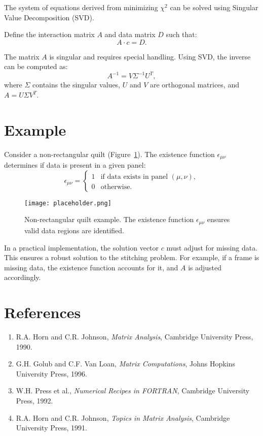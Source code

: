 \documentclass[12pt]{article}
\begin{document}
The system of equations derived from minimizing $\chi^2$ can be solved using Singular Value Decomposition (SVD). 

Define the interaction matrix $A$ and data matrix $D$ such that:
\[
A \cdot c = D.
\]

The matrix $A$ is singular and requires special handling. Using SVD, the inverse can be computed as:
\[
A^{-1} = V \Sigma^{-1} U^T,
\]
where $\Sigma$ contains the singular values, $U$ and $V$ are orthogonal matrices, and $A = U \Sigma V^T$.

\section{Example}

Consider a non-rectangular quilt (Figure~\ref{fig:nonrectangular}). The existence function $\epsilon_{\mu\nu}$ determines if data is present in a given panel:
\[
\epsilon_{\mu\nu} =
\begin{cases}
1 & \text{if data exists in panel } (\mu, \nu), \\
0 & \text{otherwise.}
\end{cases}
\]

\begin{figure}[h!]
    \centering
    \texttt{[image: placeholder.png]}
    \caption{Non-rectangular quilt example. The existence function $\epsilon_{\mu\nu}$ ensures valid data regions are identified.}
    \label{fig:nonrectangular}
\end{figure}

In a practical implementation, the solution vector $c$ must adjust for missing data. This ensures a robust solution to the stitching problem. For example, if a frame is missing data, the existence function accounts for it, and $A$ is adjusted accordingly.

\section{References}

\begin{enumerate}
    \item R.A. Horn and C.R. Johnson, \textit{Matrix Analysis}, Cambridge University Press, 1990.
    \item G.H. Golub and C.F. Van Loan, \textit{Matrix Computations}, Johns Hopkins University Press, 1996.
    \item W.H. Press et al., \textit{Numerical Recipes in FORTRAN}, Cambridge University Press, 1992.
    \item R.A. Horn and C.R. Johnson, \textit{Topics in Matrix Analysis}, Cambridge University Press, 1991.
\end{enumerate}
\end{document}
